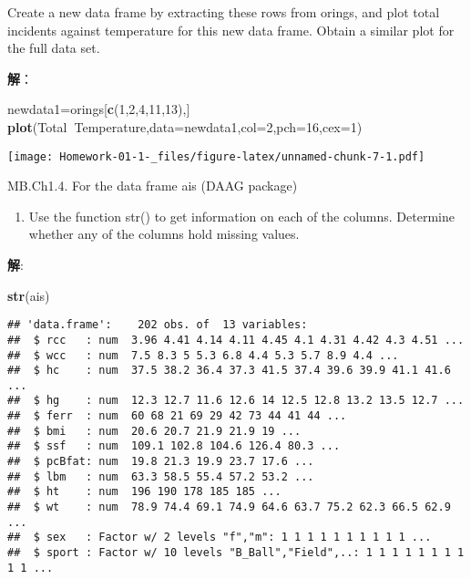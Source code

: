 \documentclass[
]{article}
\newenvironment{Shaded}{\begin{snugshade}}{\end{snugshade}}
\newcommand{\DataTypeTok}[1]{\textcolor[rgb]{0.13,0.29,0.53}{#1}}
\newcommand{\DecValTok}[1]{\textcolor[rgb]{0.00,0.00,0.81}{#1}}
\newcommand{\KeywordTok}[1]{\textcolor[rgb]{0.13,0.29,0.53}{\textbf{#1}}}
\newcommand{\NormalTok}[1]{#1}
\newcommand{\OperatorTok}[1]{\textcolor[rgb]{0.81,0.36,0.00}{\textbf{#1}}}
\providecommand{\tightlist}{%
  \setlength{\itemsep}{0pt}\setlength{\parskip}{0pt}}
\begin{document}
Create a new data frame by extracting these rows from orings, and plot
total incidents against temperature for this new data frame. Obtain a
similar plot for the full data set.

\textbf{解}：

\begin{Shaded}
\begin{Highlighting}[]
\NormalTok{newdata1=orings[}\KeywordTok{c}\NormalTok{(}\DecValTok{1}\NormalTok{,}\DecValTok{2}\NormalTok{,}\DecValTok{4}\NormalTok{,}\DecValTok{11}\NormalTok{,}\DecValTok{13}\NormalTok{),]}
\KeywordTok{plot}\NormalTok{(Total}\OperatorTok{~}\NormalTok{Temperature,}\DataTypeTok{data=}\NormalTok{newdata1,}\DataTypeTok{col=}\DecValTok{2}\NormalTok{,}\DataTypeTok{pch=}\DecValTok{16}\NormalTok{,}\DataTypeTok{cex=}\DecValTok{1}\NormalTok{)}
\end{Highlighting}
\end{Shaded}

\texttt{[image: Homework-01-1-\_files/figure-latex/unnamed-chunk-7-1.pdf]}

MB.Ch1.4. For the data frame ais (DAAG package)

\begin{enumerate}
\def\labelenumi{(\alph{enumi})}
\tightlist
\item
  Use the function str() to get information on each of the columns.
  Determine whether any of the columns hold missing values.
\end{enumerate}

\textbf{解}:

\begin{Shaded}
\begin{Highlighting}[]
\KeywordTok{str}\NormalTok{(ais)}
\end{Highlighting}
\end{Shaded}

\begin{verbatim}
## 'data.frame':    202 obs. of  13 variables:
##  $ rcc   : num  3.96 4.41 4.14 4.11 4.45 4.1 4.31 4.42 4.3 4.51 ...
##  $ wcc   : num  7.5 8.3 5 5.3 6.8 4.4 5.3 5.7 8.9 4.4 ...
##  $ hc    : num  37.5 38.2 36.4 37.3 41.5 37.4 39.6 39.9 41.1 41.6 ...
##  $ hg    : num  12.3 12.7 11.6 12.6 14 12.5 12.8 13.2 13.5 12.7 ...
##  $ ferr  : num  60 68 21 69 29 42 73 44 41 44 ...
##  $ bmi   : num  20.6 20.7 21.9 21.9 19 ...
##  $ ssf   : num  109.1 102.8 104.6 126.4 80.3 ...
##  $ pcBfat: num  19.8 21.3 19.9 23.7 17.6 ...
##  $ lbm   : num  63.3 58.5 55.4 57.2 53.2 ...
##  $ ht    : num  196 190 178 185 185 ...
##  $ wt    : num  78.9 74.4 69.1 74.9 64.6 63.7 75.2 62.3 66.5 62.9 ...
##  $ sex   : Factor w/ 2 levels "f","m": 1 1 1 1 1 1 1 1 1 1 ...
##  $ sport : Factor w/ 10 levels "B_Ball","Field",..: 1 1 1 1 1 1 1 1 1 1 ...
\end{verbatim}
\end{document}
